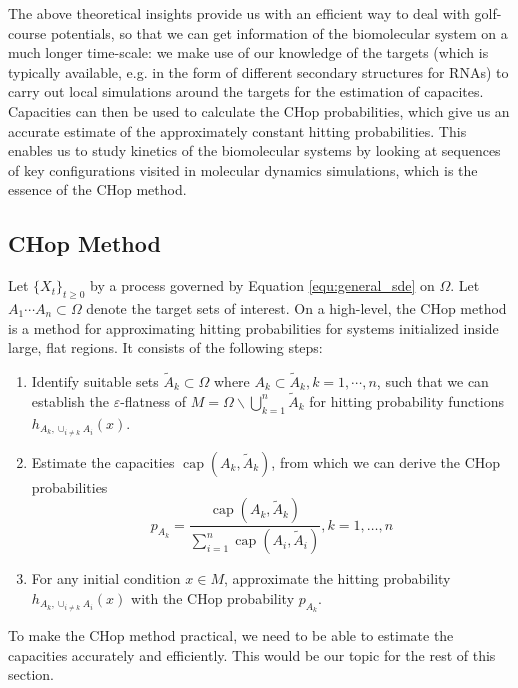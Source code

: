 \documentclass[english, aip, jcp, priprint, graphicx,floatfix]{revtex4-1}
\theoremstyle{plain}
\theoremstyle{definition}
\theoremstyle{plain}
\begin{document}
The above theoretical insights provide us with an efficient way to deal with golf-course potentials, so that we can get information of the biomolecular system on a much longer time-scale: we make use of our knowledge of the targets (which is typically available, e.g. in the form of different secondary structures for RNAs) to carry out local simulations around the targets for the estimation of capacites. Capacities can then be used to calculate the CHop probabilities, which give us an accurate estimate of the approximately constant hitting probabilities. This enables us to study kinetics of the biomolecular systems by looking at sequences of key configurations visited in molecular dynamics simulations, which is the essence of the CHop method.

\subsection{CHop Method}

Let $\{X_t\}_{t \geq 0}$ by a process governed by Equation \ref{equ:general_sde} on $\Omega$.  Let $A_1\cdots A_n \subset \Omega$ denote the target sets of interest.  On a high-level, the CHop method is a method for approximating hitting probabilities for systems initialized inside large, flat regions.  It consists of the following steps:

\begin{enumerate}
	\item Identify suitable sets $\tilde A_k \subset \Omega$ where $A_k \subset \tilde{A}_k, k=1, \cdots, n$, such that we can establish the $\varepsilon$-flatness of $M = \Omega \backslash \bigcup_{k = 1}^n \tilde{A}_k $ for hitting probability functions $h_{A_k,\cup_{i\neq k} A_i}(x)$.
	\item Estimate the capacities $\ensuremath{\operatorname{cap}} (A_k, \tilde{A}_k)$, from which we can derive the CHop probabilities
\begin{equation*}
p_{A_k} = \frac{\ensuremath{\operatorname{cap}} (A_k, \tilde{A}_k)}{\sum_{i = 1}^n \ensuremath{\operatorname{cap}} (A_i, \tilde{A}_i)}, k=1,\dots, n
\end{equation*} 
	\item For any initial condition $x \in M$, approximate the hitting probability $h_{A_k,\cup_{i\neq k} A_i}(x)$ with the CHop probability $p_{A_k}$.  
\end{enumerate}

To make the CHop method practical, we need to be able to estimate the capacities accurately and efficiently. This would be our topic for the rest of this section.
\end{document}
